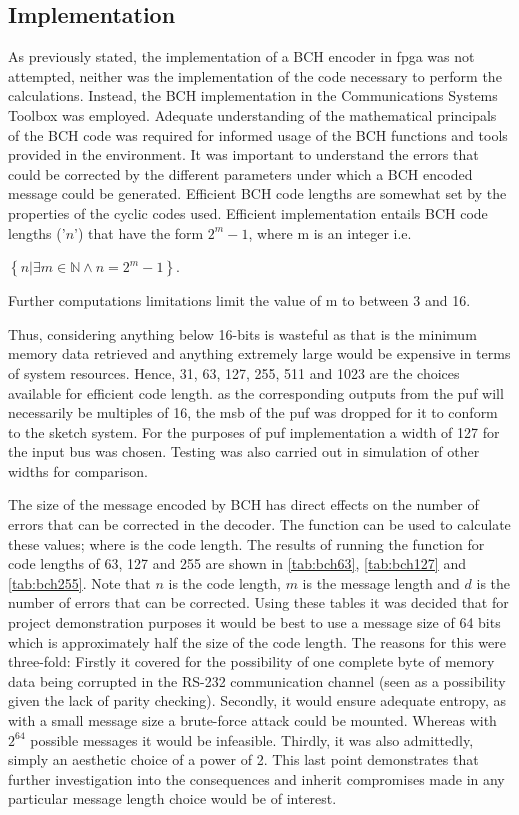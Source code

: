 \subsection{Implementation}

As previously stated, the implementation of a BCH encoder in \gls{fpga}
was not attempted, neither was the implementation of the \matlab code necessary
to perform the calculations.
Instead, the BCH implementation in the \matlab Communications Systems Toolbox was employed.
Adequate understanding of the mathematical principals of the BCH code was
required for informed usage of the BCH functions and tools provided in the \matlab environment.
It was important to understand the errors that could be corrected by the different
parameters under which a BCH encoded message could be generated.
Efficient BCH code lengths are somewhat set by the properties of the cyclic
codes used. Efficient implementation entails BCH code lengths ('$n$') that
have the form $2^{m}-1$,
where m is an integer i.e.

$ \left\{ n | \exists m \in \mathbb{N} \wedge n = 2^{m} -1  \right\} $.

Further \matlab computations limitations limit the value of m to between 3 and 16.

Thus, considering anything below 16-bits is wasteful as that is the minimum
memory data retrieved and anything extremely large would be expensive in terms
of system resources. Hence, 31, 63, 127, 255, 511 and 1023 are the
choices available for efficient code length. as the corresponding outputs
from the \gls{puf} will necessarily be multiples of 16, the \gls{msb} of the \gls{puf}
was dropped for it to conform to the sketch system.
For the purposes of \gls{puf} implementation a width of 127 for the input bus was chosen.
Testing was also carried out in simulation of other widths for comparison.

The size of the message encoded by BCH has direct effects on the number
of errors that can be corrected in the decoder. The \matlab function
 can be used to calculate these values;
where  is the code length. The results of running the
function for code lengths of 63, 127 and 255 are shown in \autoref{tab:bch63},
\autoref{tab:bch127} and \autoref{tab:bch255}. Note that $n$ is the code
length, $m$ is the message length and $d$ is the number of errors that can be
corrected. Using these tables it was
decided that for project demonstration purposes it would be best to use a
message size of 64 bits which is approximately half the size of the code length.
The reasons for this were three-fold: Firstly it covered for the possibility of
one complete byte of memory data being corrupted in the RS-232 communication
channel (seen as a possibility given the lack of parity checking).
Secondly, it would ensure adequate entropy, as with a small message size a
brute-force attack could be mounted. Whereas with $2^{64}$ possible messages it
would be infeasible. Thirdly, it was also admittedly, simply an aesthetic choice of a power of 2.
This last point demonstrates that further investigation into the consequences
and inherit compromises made in any particular message length choice would be of
interest.

